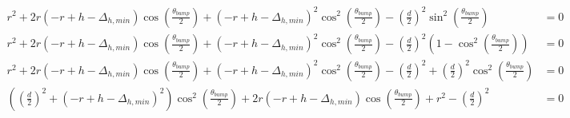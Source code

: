 \documentclass{article}
\begin{document}
	 \begin{align}
	 r^{2} + 2 r \left(- r + h - \Delta_{h, min}\right) \cos \left({\frac{\theta_{bump}}{2}}\right) + \left(- r + h - \Delta_{h, min}\right)^{2} \cos^{2} \left({\frac{\theta_{bump}}{2}}\right) - \left(\frac{d}{2}\right)^{2} \sin^{2} \left({\frac{\theta_{bump}}{2}}\right) &= 0 \\
	 r^{2} + 2 r \left(- r + h - \Delta_{h, min}\right) \cos \left({\frac{\theta_{bump}}{2}}\right) + \left(- r + h - \Delta_{h, min}\right)^{2} \cos^{2} \left({\frac{\theta_{bump}}{2}}\right) - \left(\frac{d}{2}\right)^{2} \left(1 - \cos^{2} \left({\frac{\theta_{bump}}{2}}\right)\right) &= 0 \\
	 r^{2} + 2 r \left(- r + h - \Delta_{h, min}\right) \cos \left({\frac{\theta_{bump}}{2}}\right) + \left(- r + h - \Delta_{h, min}\right)^{2} \cos^{2} \left({\frac{\theta_{bump}}{2}}\right) - \left(\frac{d}{2}\right)^{2} + \left(\frac{d}{2}\right)^{2} \cos^{2} \left({\frac{\theta_{bump}}{2}}\right) &= 0 \\
	 \left(\left(\frac{d}{2}\right)^{2} + \left(- r + h - \Delta_{h, min}\right)^{2}\right) \cos^{2} \left({\frac{\theta_{bump}}{2}}\right) + 2 r \left(- r + h - \Delta_{h, min}\right) \cos \left({\frac{\theta_{bump}}{2}}\right) + r^{2} - \left(\frac{d}{2}\right)^{2} &= 0
	 \end{align}
	 
\end{document}
